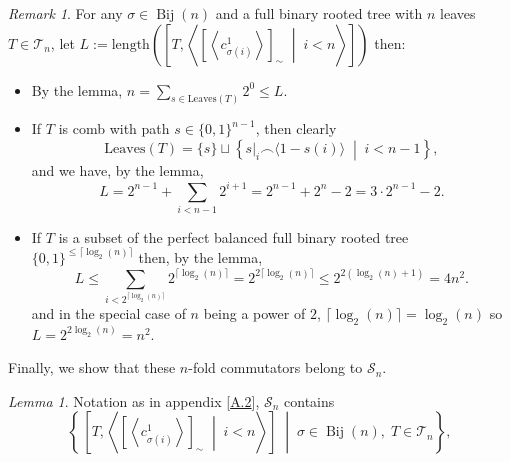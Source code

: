 \documentclass[11pt, a4paper, oneside]{article}
\theoremstyle{remark}
\newtheorem*{remark}{Remark}
\theoremstyle{lemma}
\newtheorem*{lemma}{Lemma}
\begin{document}
\begin{remark}
For any $\sigma \in \operatorname{Bij}(n)$ and a full binary rooted tree with $n$ leaves $T \in \mathcal{T}_n$, let $L:=\mathrm{length}\!\left(\left[ T, \left\langle \left[ \left\langle c_{\sigma(i)}^1 \right\rangle \right]_{\sim} \;\middle|\; i<n \right\rangle \right]\right)$ then:
\begin{itemize}
    \item By the lemma, \( n=\sum_{s\in\mathrm{Leaves}(T)}2^{0}\leq L\).
    \item If $T$ is comb with path $s \in \{0,1\}^{n-1}$, then clearly
    \[
    \mathrm{Leaves}(T) = \{s\} \sqcup \left\{ s|_{i} \frown \langle 1-s(i) \rangle \;\middle|\; i<n-1 \right\},
    \]
    and we have, by the lemma,
    \[
    L= 2^{n-1}+\sum_{i<n-1} 2^{i+1}=2^{n-1}+ 2^{n}-2=3\cdot 2^{n-1}-2.
    \]
    \item If $T$ is a subset of the perfect balanced full binary rooted tree \(\{0,1\}^{\leq \lceil\log_2(n)\rceil}\) then, by the lemma,
    \[
    L\leq \sum_{i< 2^{\lceil\log_2(n)\rceil}} 2^{\lceil\log_2(n)\rceil}=2^{2\lceil\log_2(n)\rceil}\leq 2^{2(\log_2(n)+1)}=4n^2.
    \]
    and in the special case of \(n\) being a power of $2$, $\lceil\log_2(n)\rceil=\log_2(n)$ so $L=2^{2\log_2(n)}=n^2$.
\end{itemize}
\end{remark}
Finally, we show that these $n$-fold commutators belong to \(\mathcal{S}_n\).
\begin{lemma}
Notation as in appendix [\hyperref[A2]{A.2}], 
\(\mathcal{S}_n\) contains 
\[
\left\{ \, 
\left[ T, \left\langle \left[ \left\langle c_{\sigma(i)}^1 \right\rangle \right]_{\sim} \;\middle|\; i<n \right\rangle \right] 
\;\middle|\; 
\sigma \in \operatorname{Bij}(n), \; 
T \in \mathcal{T}_n 
\right\},
\]
\end{lemma}
\end{document}
